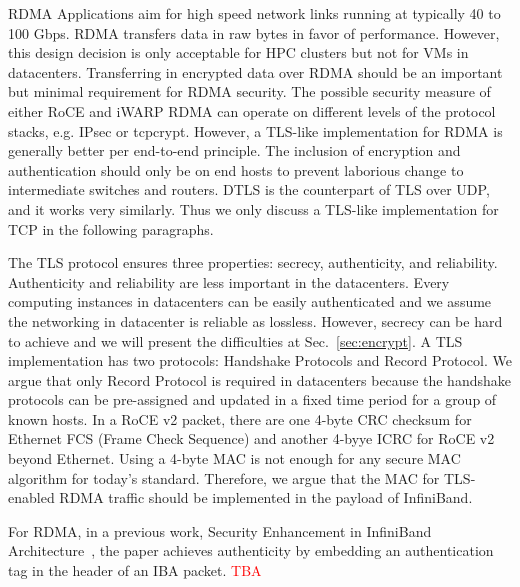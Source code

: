 RDMA Applications aim for high speed network links running at typically 40 to 100 Gbps. RDMA transfers data in raw bytes in favor of performance. However, this design decision is only acceptable for HPC clusters but not for VMs in datacenters. Transferring in encrypted data over RDMA should be an important but minimal requirement for RDMA security. The possible security measure of either RoCE and iWARP RDMA can operate on different levels of the protocol stacks, e.g. IPsec or tcpcrypt. However, a TLS-like implementation for RDMA is generally better per end-to-end principle. The inclusion of encryption and authentication should only be on end hosts to prevent laborious change to intermediate switches and routers. DTLS is the counterpart of TLS over UDP, and it works very similarly. Thus we only discuss a TLS-like implementation for TCP in the following paragraphs.

The TLS protocol ensures three properties: secrecy, authenticity, and reliability. Authenticity and reliability are less important in the datacenters. Every computing instances in datacenters can be easily authenticated and we assume the networking in datacenter is reliable as lossless. However, secrecy can be hard to achieve and we will present the difficulties at Sec.~\ref{sec:encrypt}. A TLS implementation has two protocols: Handshake Protocols and Record Protocol. We argue that only Record Protocol is required in datacenters because the handshake protocols can be pre-assigned and updated in a fixed time period for a group of known hosts. In a RoCE v2 packet, there are one 4-byte CRC checksum for Ethernet FCS (Frame Check Sequence) and another 4-byye ICRC for RoCE v2 beyond Ethernet. Using a 4-byte MAC is not enough for any secure MAC algorithm for today's standard. Therefore, we argue that the MAC for TLS-enabled RDMA traffic should be implemented in the payload of InfiniBand.

For RDMA, in a previous work, Security Enhancement in InfiniBand Architecture~\cite{Lee:2005:SEI:1053727.1054449}, the paper achieves authenticity by embedding an authentication tag in the
header of an IBA packet. \textcolor{red}{TBA}
